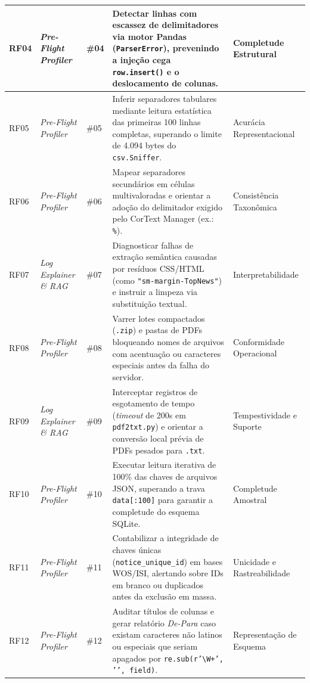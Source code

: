 \documentclass[
	oneside,
	a4paper,
	12pt,
	chapter=TITLE,
	section=TITLE,
	english,
	brazilian
]{abntex2}
\begin{document}
{\begin{xltabular}{\textwidth}{|>{\centering\arraybackslash}p{1.4cm}|>{\raggedright\arraybackslash}p{2.4cm}|>{\centering\arraybackslash}p{1.6cm}|>{\raggedright\arraybackslash}X|>{\raggedright\arraybackslash}p{2.8cm}|}
  RF04 & \textit{Pre-Flight Profiler} & \#04 & Detectar linhas com escassez de delimitadores via motor Pandas (\texttt{ParserError}), prevenindo a injeção cega \texttt{row.\allowbreak insert()} e o deslocamento de colunas. & Completude Estrutural \\ \hline
  RF05 & \textit{Pre-Flight Profiler} & \#05 & Inferir separadores tabulares mediante leitura estatística das primeiras 100 linhas completas, superando o limite de 4.094 bytes do \texttt{csv.\allowbreak Sniffer}. & Acurácia Representacional \\ \hline
  RF06 & \textit{Pre-Flight Profiler} & \#06 & Mapear separadores secundários em células multivaloradas e orientar a adoção do delimitador exigido pelo CorText Manager (ex.: \texttt{\textbar{}\%\textbar{}}). & Consistência Taxonômica \\ \hline
  RF07 & \textit{Log Explainer \& RAG} & \#07 & Diagnosticar falhas de extração semântica causadas por resíduos CSS/HTML (como \texttt{"sm-margin-TopNews"}) e instruir a limpeza via substituição textual. & Interpretabilidade \\ \hline
  RF08 & \textit{Pre-Flight Profiler} & \#08 & Varrer lotes compactados (\texttt{.zip}) e pastas de PDFs bloqueando nomes de arquivos com acentuação ou caracteres especiais antes da falha do servidor. & Conformidade Operacional \\ \hline
  RF09 & \textit{Log Explainer \& RAG} & \#09 & Interceptar registros de esgotamento de tempo (\textit{timeout} de 200s em \texttt{pdf2txt.\allowbreak py}) e orientar a conversão local prévia de PDFs pesados para \texttt{.txt}. & Tempestividade e Suporte \\ \hline
  RF10 & \textit{Pre-Flight Profiler} & \#10 & Executar leitura iterativa de 100\% das chaves de arquivos JSON, superando a trava \texttt{data[:100]} para garantir a completude do esquema SQLite. & Completude Amostral \\ \hline
  RF11 & \textit{Pre-Flight Profiler} & \#11 & Contabilizar a integridade de chaves únicas (\texttt{notice\_\allowbreak unique\_\allowbreak id}) em bases WOS/ISI, alertando sobre IDs em branco ou duplicados antes da exclusão em massa. & Unicidade e Rastreabilidade \\ \hline
  RF12 & \textit{Pre-Flight Profiler} & \#12 & Auditar títulos de colunas e gerar relatório \textit{De-Para} caso existam caracteres não latinos ou especiais que seriam apagados por \texttt{re.\allowbreak sub(r'\textbackslash{}W+', '{}', field)}. & Representação de Esquema \\ \hline

\end{xltabular}}
\end{document}
